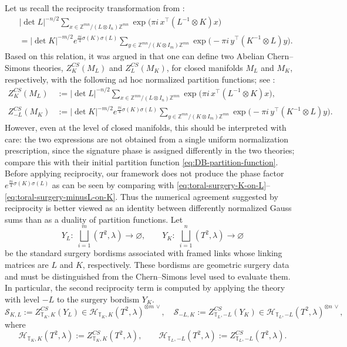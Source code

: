 \documentclass[12pt]{amsart}
\numberwithin{equation}{section}
\theoremstyle{definition}
\begin{document}
Let us recall the reciprocity transformation from \cite[Theorem 1]{Deloup2005}:
$$\begin{aligned} \label{eq:CS-reciprocity} &|\det L|^{-n/2} \sum_{x\in \mathbb Z^{mn}/(L\otimes I_n)\mathbb Z^{mn}} \exp\!\bigl(\pi i\,x^\top(L^{-1}\otimes K)x\bigr)\\ &=|\det K|^{-m/2} e^{\frac{\pi i}{4}\sigma(K)\sigma(L)} \sum_{y\in \mathbb Z^{mn}/(K\otimes I_m)\mathbb Z^{mn}} \exp\!\bigl(-\pi i\,y^\top(K^{-1}\otimes L)y\bigr). \end{aligned}$$
Based on this relation, it was argued in \cite[Section 2.5]{Kim2024} that one can define two Abelian Chern--Simons theories,
$Z^{CS}_K(M_L)$ and $Z^{CS}_L(M_K)$, for closed manifolds $M_L$ and $M_K$, respectively, with the following ad hoc normalized partition functions; see \cite[Sec.~(E)]{Kim2024}:
$$
\begin{aligned}
Z^{CS}_K(M_L)
&:=
|\det L|^{-n/2}
\sum_{x\in \mathbb Z^{mn}/(L\otimes I_n)\mathbb Z^{mn}}
\exp\!\bigl(\pi i\,x^\top(L^{-1}\otimes K)x\bigr),
\\
Z^{CS}_{-L}(M_K)
&:=
|\det K|^{-m/2}
e^{\frac{\pi i}{4}\sigma(K)\sigma(L)}
\sum_{y\in \mathbb Z^{mn}/(K\otimes I_m)\mathbb Z^{mn}}
\exp\!\bigl(-\pi i\,y^\top(K^{-1}\otimes L)y\bigr).
\end{aligned}
$$
However, even at the level of closed manifolds, this should be interpreted with care: the two expressions are not obtained from a single uniform normalization prescription, since the signature phase is assigned differently in the two theories; compare this with their initial partition function \eqref{eq:DB-partition-function}. Before applying reciprocity, our framework does not produce the phase factor
$
e^{\frac{\pi i}{4}\sigma(K)\sigma(L)}
$
as can be seen by comparing with \eqref{eq:toral-surgery-K-on-L}--\eqref{eq:toral-surgery-minusL-on-K}. Thus the numerical agreement suggested by reciprocity is better viewed as an identity between differently normalized Gauss sums than as a  duality of partition functions. 
Let
$$
Y_L:\;\bigsqcup_{i=1}^{m}(T^2,\lambda)\to\varnothing,
\qquad
Y_K:\;\bigsqcup_{i=1}^{n}(T^2,\lambda)\to\varnothing
$$
be the standard surgery bordisms associated with framed links whose linking matrices are $L$ and $K$, respectively. These bordisms are geometric surgery data and must be distinguished from the Chern--Simons level used to evaluate them. In particular, the second reciprocity term is computed by applying the theory with level $-L$ to the surgery bordism $Y_K$.
$$
\mathcal S_{K,L}:=
Z^{CS}_{\mathbb T_K,K}(Y_L)
\in
\mathcal H_{\mathbb T_K,K}(T^2,\lambda)^{\otimes m\,\vee},\quad
\mathcal S_{-L,K}:=
Z^{CS}_{\mathbb T_L,-L}(Y_K)
\in
\mathcal H_{\mathbb T_L,-L}(T^2,\lambda)^{\otimes n\,\vee},
$$
where
$$
\mathcal H_{\mathbb T_K,K}(T^2,\lambda)
:=
Z^{CS}_{\mathbb T_K,K}(T^2,\lambda),\qquad
\mathcal H_{\mathbb T_L,-L}(T^2,\lambda):=Z^{CS}_{\mathbb T_L,-L}(T^2,\lambda).
$$
\end{document}
